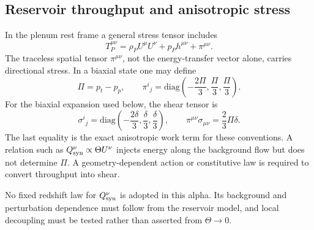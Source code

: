 \subsection{Reservoir throughput and anisotropic stress}

In the plenum rest frame a general stress tensor includes
\begin{equation}
 T_P^{\mu\nu}=\rho_P U^\mu U^\nu+p_Ph^{\mu\nu}+\pi^{\mu\nu}.
 \label{eq:plenum-stress}
\end{equation}
The traceless spatial tensor $\pi^{\mu\nu}$, not the energy-transfer vector
alone, carries directional stress.  In a biaxial state one may define
\begin{equation}
 \Pi=p_t-p_p,
 \qquad
 \pi^i{}_j=\mathrm{diag}\left(-\frac{2\Pi}{3},\frac{\Pi}{3},\frac{\Pi}{3}\right).
 \label{eq:biaxial-pi}
\end{equation}
For the biaxial expansion used below, the shear tensor is
\begin{equation}
 \sigma^i{}_j=\mathrm{diag}\left(-\frac{2\delta}{3},
 \frac{\delta}{3},\frac{\delta}{3}\right),
 \qquad
 \pi^{\mu\nu}\sigma_{\mu\nu}=\frac{2}{3}\Pi\delta.
 \label{eq:anisotropic-work}
\end{equation}
The last equality is the exact anisotropic work term for these conventions.
A relation such as $Q_{\rm syn}^{\nu}\propto\Theta U^\nu$ injects energy along
the background flow but does not determine $\Pi$.  A geometry-dependent
action or constitutive law is required to convert throughput into shear.

No fixed redshift law for $Q_{\rm syn}^{\nu}$ is adopted in this alpha.  Its
background and perturbation dependence must follow from the reservoir model,
and local decoupling must be tested rather than asserted from $\Theta\to0$.
